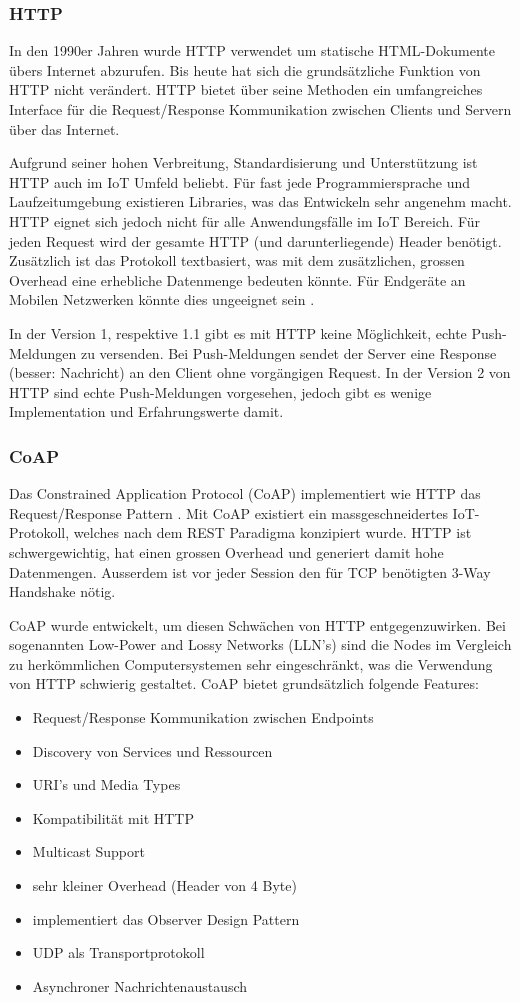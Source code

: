 \subsubsection{HTTP}
In den 1990er Jahren wurde HTTP verwendet um statische HTML-Dokumente übers Internet abzurufen. Bis heute hat sich die grundsätzliche Funktion von HTTP nicht verändert. HTTP bietet über seine Methoden ein umfangreiches Interface für die Request/Response Kommunikation zwischen Clients und Servern über das Internet. 

Aufgrund seiner hohen Verbreitung, Standardisierung und Unterstützung ist HTTP auch im IoT Umfeld beliebt. Für fast jede Programmiersprache und Laufzeitumgebung existieren Libraries, was das Entwickeln sehr angenehm macht. HTTP eignet sich jedoch nicht für alle Anwendungsfälle im IoT Bereich. Für jeden Request wird der gesamte HTTP (und darunterliegende) Header benötigt. Zusätzlich ist das Protokoll textbasiert, was mit dem zusätzlichen, grossen Overhead eine erhebliche Datenmenge bedeuten könnte. Für Endgeräte an Mobilen Netzwerken könnte dies ungeeignet sein \cite{Obermaier15}.

In der Version 1, respektive 1.1 gibt es mit HTTP keine Möglichkeit, echte Push-Meldungen zu versenden. Bei Push-Meldungen sendet der Server eine Response (besser: Nachricht) an den Client ohne vorgängigen Request. In der Version 2 von HTTP sind echte Push-Meldungen vorgesehen, jedoch gibt es wenige Implementation und Erfahrungswerte damit.
\subsubsection{CoAP}
Das Constrained Application Protocol (CoAP) implementiert wie HTTP das Request/Response Pattern \cite{Obermaier15}. Mit CoAP existiert ein massgeschneidertes IoT-Protokoll, welches nach dem REST Paradigma konzipiert wurde. HTTP ist schwergewichtig, hat einen grossen Overhead und generiert damit hohe Datenmengen. Ausserdem ist vor jeder Session den für TCP benötigten 3-Way Handshake nötig. 
 
CoAP wurde entwickelt, um diesen Schwächen von HTTP entgegenzuwirken. Bei sogenannten Low-Power and Lossy Networks (LLN's) sind die Nodes im Vergleich zu herkömmlichen Computersystemen sehr eingeschränkt, was die Verwendung von HTTP schwierig gestaltet. CoAP bietet grundsätzlich folgende Features:\cite{RFC7252}
\begin{itemize}
\item Request/Response Kommunikation zwischen Endpoints	
\item Discovery von Services und Ressourcen
\item URI's und Media Types
\item Kompatibilität mit HTTP
\item Multicast Support
\item sehr kleiner Overhead (Header von 4 Byte)
\item implementiert das Observer Design Pattern
\item UDP als Transportprotokoll
\item Asynchroner Nachrichtenaustausch
\end{itemize}
 
